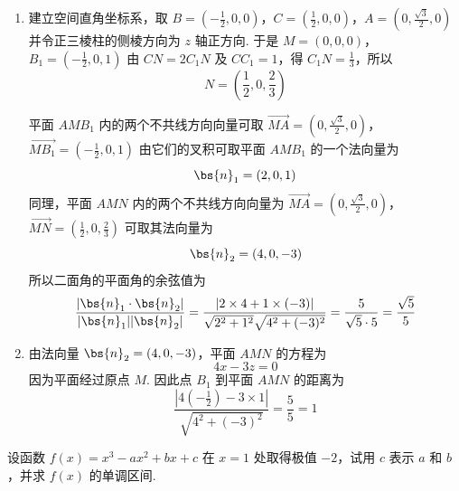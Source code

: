 \begin{solution}
\begin{enumerate}
\item 建立空间直角坐标系，取
\(B=\left(-\frac12,0,0\right)\)，\(C=\left(\frac12,0,0\right)\)，\(A=\left(0,\frac{\sqrt3}{2},0\right)\)
并令正三棱柱的侧棱方向为 \(z\) 轴正方向. 于是
\(M=(0,0,0)\)，\(B_1=\left(-\frac12,0,1\right)\)
由 \(CN=2C_1N\) 及 \(CC_1=1\)，得 \(C_1N=\frac13\)，所以
\[
N=\left(\frac12,0,\frac23\right)
\]

平面 \(AMB_1\) 内的两个不共线方向向量可取
\(\overrightarrow{MA}=\left(0,\frac{\sqrt3}{2},0\right)\)，\(\overrightarrow{MB_1}=\left(-\frac12,0,1\right)\)
由它们的叉积可取平面 \(AMB_1\) 的一个法向量为
\[
\bs{n}_1=(2,0,1)
\]
同理，平面 \(AMN\) 内的两个不共线方向向量为
\(\overrightarrow{MA}=\left(0,\frac{\sqrt3}{2},0\right)\)，\(\overrightarrow{MN}=\left(\frac12,0,\frac23\right)\)
可取其法向量为
\[
\bs{n}_2=(4,0,-3)
\]
所以二面角的平面角的余弦值为
\[
\frac{|\bs{n}_1\cdot\bs{n}_2|}{|\bs{n}_1||\bs{n}_2|}
=\frac{|2\times4+1\times(-3)|}{\sqrt{2^2+1^2}\sqrt{4^2+(-3)^2}}
=\frac5{\sqrt5\cdot5}
=\frac{\sqrt5}{5}
\]

\item 由法向量 \(\bs{n}_2=(4,0,-3)\)，平面 \(AMN\) 的方程为
\[
4x-3z=0
\]
因为平面经过原点 \(M\). 因此点 \(B_1\) 到平面 \(AMN\) 的距离为
\[
\frac{|4\left(-\frac12\right)-3\times1|}{\sqrt{4^2+(-3)^2}}
=\frac5{5}=1
\]
\end{enumerate}
\end{solution}

\begin{problem}
设函数 \( f(x) = x^3 - ax^2 + bx + c \) 在 \( x = 1 \) 处取得极值 \(-2\)，试用 \( c \) 表示 \( a \) 和 \( b \)，并求 \( f(x) \) 的单调区间.
\end{problem}

